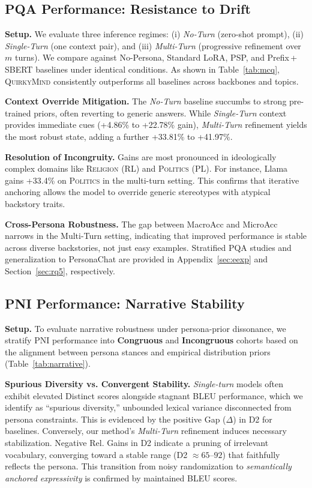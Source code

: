 \subsection{PQA Performance: Resistance to Drift}\label{sec:rq1}
\noindent \textbf{Setup.}
We evaluate three inference regimes: (i) \textit{No-Turn} (zero-shot prompt), (ii) \textit{Single-Turn} (one context pair), and (iii) \textit{Multi-Turn} (progressive refinement over $m$ turns). We compare against No-Persona, Standard LoRA, PSP, and Prefix\,+\,SBERT baselines under identical conditions. As shown in Table~\ref{tab:mcq}, \textsc{QuirkyMind} consistently outperforms all baselines across backbones and topics.

\noindent \textbf{Context Override Mitigation.}
The \textit{No-Turn} baseline succumbs to strong pre-trained priors, often reverting to generic answers. While \textit{Single-Turn} context provides immediate cues (+4.86\% to +22.78\% gain), \textit{Multi-Turn} refinement yields the most robust state, adding a further +33.81\% to +41.97\%.

\noindent \textbf{Resolution of Incongruity.}
Gains are most pronounced in ideologically complex domains like \textsc{Religion} (RL) and \textsc{Politics} (PL). For instance, Llama gains +33.4\% on \textsc{Politics} in the multi-turn setting. This confirms that iterative anchoring allows the model to override generic stereotypes with atypical backstory traits.

\noindent\textbf{Cross-Persona Robustness.}
The gap between MacroAcc and MicroAcc narrows in the Multi-Turn setting, indicating that improved performance is stable across diverse backstories, not just easy examples. Stratified PQA studies and generalization to PersonaChat are provided in Appendix~\ref{sec:eexp} and Section~\ref{sec:rq5}, respectively.







\subsection{PNI Performance: Narrative Stability}\label{sec:rq2}
\noindent \textbf{Setup.} To evaluate narrative robustness under persona-prior dissonance, we stratify PNI performance into \textbf{Congruous} and \textbf{Incongruous} cohorts based on the alignment between persona stances and empirical distribution priors (Table~\ref{tab:narrative}).

\noindent \textbf{Spurious Diversity vs. Convergent Stability.} \textit{Single-turn} models often exhibit elevated Distinct scores alongside stagnant BLEU performance, which we identify as ``spurious diversity,'' unbounded lexical variance disconnected from persona constraints. This is evidenced by the positive \colorbox{stable}{Gap ($\Delta$)} in D2 for baselines. Conversely, our method's \textit{Multi-Turn} refinement induces necessary stabilization. Negative \colorbox{gray!10}{Rel. Gains} in D2 indicate a pruning of irrelevant vocabulary, converging toward a stable range (D2 $\approx 65$--$92$) that faithfully reflects the persona. This transition from noisy randomization to \textit{semantically anchored expressivity} is confirmed by maintained BLEU scores.

